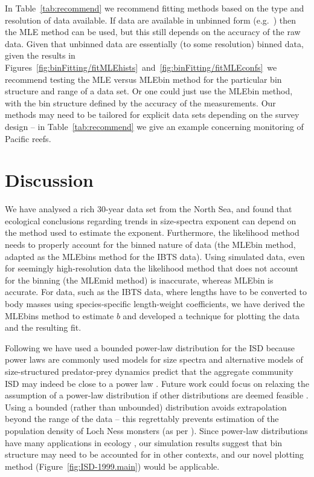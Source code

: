 \documentclass[12pt, letter]{article}
\newcommand{\fitMLEhists}{\ref{fig:binFitting/fitMLEhists}}
\newcommand{\fitMLEconfs}{\ref{fig:binFitting/fitMLEconfs}}
\newcommand{\MEE}{erpbb17}     %
\begin{document}
In Table~\ref{tab:recommend} we recommend fitting methods based on the type
and resolution of data available.
If data are available in unbinned form (e.g.~\citealt{tdss15})
then the MLE method can be used, but this still depends on the accuracy of the raw
data. Given that unbinned data are
essentially (to some resolution) binned data,
given the results in Figures~\fitMLEhists\ and~\fitMLEconfs\ we recommend
testing the MLE versus MLEbin method for the particular bin structure and range
of a data set.
Or one could just use the MLEbin method, with the bin structure
defined by the accuracy of the measurements.
Our methods may need to be tailored for explicit data sets depending on the
survey design -- in Table~\ref{tab:recommend} we give an example concerning
monitoring of Pacific reefs.

\section{Discussion}

We have analysed a rich 30-year data set from the North Sea, and found that
ecological conclusions regarding trends in size-spectra exponent can depend on
the method used to estimate the exponent. Furthermore, the likelihood method
needs to properly account for the binned nature of data (the MLEbin method,
adapted as the MLEbins method for the IBTS data). Using simulated data, even for
seemingly high-resolution data the likelihood method that does not account for
the binning (the MLEmid method) is inaccurate, whereas MLEbin is accurate.
For data, such as the IBTS data, where lengths have to be converted to body
masses using species-specific length-weight coefficients, we have derived
the MLEbins method to estimate $b$ and developed a technique for plotting the
data and the resulting fit.

Following \citet{\MEE} we have used a bounded power-law distribution for the ISD
because power laws are commonly used models for size spectra \citep{pd78, bd92}
and alternative models of size-structured predator-prey dynamics predict
that the aggregate community ISD may indeed be
close to a power law \citep{ab06}.
Future work could focus on relaxing the
assumption of a power-law distribution
if other distributions are deemed feasible \citep{\MEE}.
Using a bounded (rather than unbounded) distribution avoids extrapolation
beyond the range of the data -- this regrettably prevents estimation
of the population density of Loch Ness monsters (as per \citealt{sk72}).
Since power-law distributions have many applications in ecology \citep{weg08},
our simulation results suggest that bin structure may need to be accounted for
in other contexts, and our novel plotting method
(Figure~\ref{fig:ISD-1999.main}) would be applicable.
\end{document}
